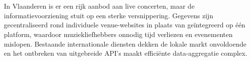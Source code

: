 
%
%
%
%
%

%



\chapter*{}

In Vlaanderen is er een rijk aanbod aan live concerten, maar de informatievoorziening stuit op een sterke versnippering. 
Gegevens zijn gecentraliseerd rond individuele venue-websites in plaats van geïntegreerd op één platform, waardoor muziekliefhebbers 
onnodig tijd verliezen en evenementen mislopen. Bestaande internationale diensten dekken de lokale markt onvoldoende en het ontbreken 
van uitgebreide \gls{API}'s maakt efficiënte data-aggregatie complex. 

